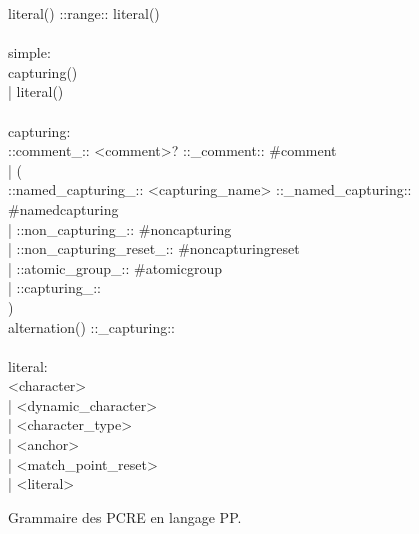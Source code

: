 \begin{figure}
\begin{bigbigpre}
    literal() ::range:: literal() \\
 \\
simple: \\
    capturing() \\
  | literal() \\
 \\
capturing: \\
    ::comment_:: <comment>? ::_comment:: #comment \\
  | ( \\
        ::named_capturing_:: <capturing_name> ::_named_capturing:: #namedcapturing \\
      | ::non_capturing_:: #noncapturing \\
      | ::non_capturing_reset_:: #noncapturingreset \\
      | ::atomic_group_:: #atomicgroup \\
      | ::capturing_:: \\
    ) \\
    alternation() ::_capturing:: \\
 \\
literal: \\
    <character> \\
  | <dynamic_character> \\
  | <character_type> \\
  | <anchor> \\
  | <match_point_reset> \\
  | <literal>
\end{bigbigpre}

\caption{\label{figure:appendices:grammar_of_pcre} Grammaire des PCRE en langage
PP.}

\end{figure}
